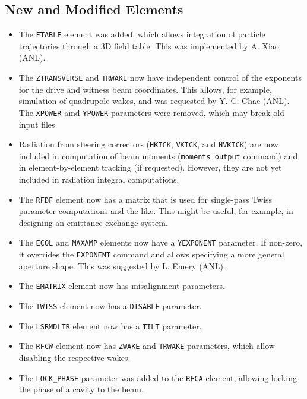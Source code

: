\documentclass[11pt]{article}
\begin{document}
\subsection{New and Modified Elements}
\begin{itemize}
\item The {\tt FTABLE} element was added, which allows integration of particle trajectories through a 3D field table.  This was implemented
  by A. Xiao (ANL).
\item The {\tt ZTRANSVERSE} and {\tt TRWAKE} now have independent control of the 
  exponents for the drive and witness beam coordinates.  This allows, for example,
  simulation of quadrupole wakes, and was requested by Y.-C. Chae (ANL).
  The {\tt XPOWER} amd {\tt YPOWER} parameters were removed, which may break old
  input files.
\item Radiation from steering correctors ({\tt HKICK}, {\tt VKICK},
  and {\tt HVKICK}) are now included in computation of beam moments
  ({\tt moments\_output} command) and in element-by-element tracking
  (if requested).  However, they are not yet included in radiation integral computations.
\item The {\tt RFDF} element now has a matrix that is used for single-pass Twiss parameter computations and the like. This
  might be useful, for example, in designing an emittance exchange system.
\item The {\tt ECOL} and {\tt MAXAMP} elements now have a {\tt YEXPONENT} parameter. If non-zero, it overrides the {\tt EXPONENT}
  command and allows specifying a more general aperture shape. This was suggested by L. Emery (ANL).
\item The {\tt EMATRIX} element now has misalignment parameters.
\item The {\tt TWISS} element now has a {\tt DISABLE} parameter.
\item The {\tt LSRMDLTR} element now has a {\tt TILT} parameter.
\item The {\tt RFCW} element now has {\tt ZWAKE} and {\tt TRWAKE} parameters, which allow disabling the respective wakes.
\item The \verb|LOCK_PHASE| parameter was added to the {\tt RFCA} element, allowing locking the phase of a cavity to the beam.
\end{itemize}
\end{document}
